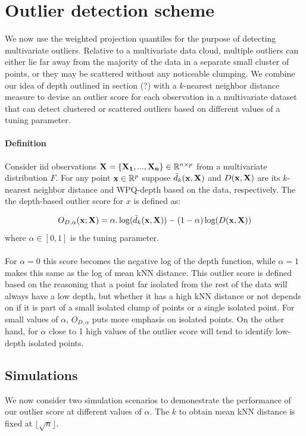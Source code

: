 \documentclass[10pt]{article}
\begin{document}
\section{Outlier detection scheme} We now use the weighted projection quantiles for the purpose of detecting multivariate outliers. Relative to a multivariate data cloud, multiple outliers can either lie far away from the majority of the data in a separate small cluster of points, or they may be scattered without any noticeable clumping. We combine our idea of depth outlined in section (?) with a $k$-nearest neighbor distance measure to devise an outlier score for each observation in a multivariate dataset that can detect clustered or scattered outliers based on different values of a tuning parameter.

\paragraph{Definition}Consider iid observations ${\bf X} = \{{\bf X_1},...,{\bf X_n}\} \in \mathbb{R}^{n\times p}$ from a multivariate distribution $F$. For any point ${\bf x} \in \mathbb{R}^p$ suppose $\bar d_k({\bf x},{\bf X})$ and $D({\bf x}, {\bf X})$ are its $k$-nearest neighbor distance and WPQ-depth based on the data, respectively. The the depth-based outlier score for $x$ is defined as:

$$ O_{D,\alpha}({\bf x}; {\bf X}) = \alpha. \log (\bar d_k({\bf x},{\bf X})) - (1 - \alpha)\log (D({\bf x}, {\bf X}))$$
where $\alpha \in [0,1]$ is the tuning parameter.\

\paragraph{}For $\alpha=0$ this score becomes the negative log of the depth function, while $\alpha=1$ makes this same as the log of mean kNN distance. This outlier score is defined based on the reasoning that a point far isolated from the rest of the data will always have a low depth, but whether it has a high kNN distance or not depends  on if it is part of a small isolated clump of points or a single isolated point. For small values of $\alpha$, $O_{D, \alpha}$ puts more emphasis on isolated points. On the other hand, for $\alpha$ close to 1 high values of the outlier score will tend to identify low-depth isolated points.

\subsection{Simulations}We now consider two simulation scenarios to demonestrate the performance of our outlier score at different values of $\alpha$. The $k$ to obtain mean kNN distance is fixed at $\lfloor \sqrt{n} \rfloor$.
\end{document}
